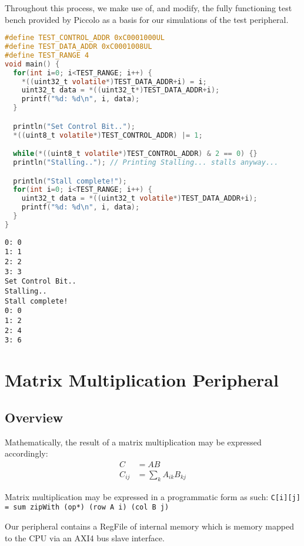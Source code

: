 \documentclass[a4paper,9pt]{report}
\begin{document}
Throughout this process, we make use of, and modify, the fully functioning test
bench provided by Piccolo as a basis for our simulations of the test peripheral.

\begin{lstlisting}[language=C,style=customc]
#define TEST_CONTROL_ADDR 0xC0001000UL
#define TEST_DATA_ADDR 0xC0001008UL
#define TEST_RANGE 4
void main() {
  for(int i=0; i<TEST_RANGE; i++) {
    *((uint32_t volatile*)TEST_DATA_ADDR+i) = i;
    uint32_t data = *((uint32_t*)TEST_DATA_ADDR+i);
    printf("%d: %d\n", i, data);
  }

  println("Set Control Bit..");
  *((uint8_t volatile*)TEST_CONTROL_ADDR) |= 1;

  while(*((uint8_t volatile*)TEST_CONTROL_ADDR) & 2 == 0) {}
  println("Stalling.."); // Printing Stalling... stalls anyway...

  println("Stall complete!");
  for(int i=0; i<TEST_RANGE; i++) {
    uint32_t data = *((uint32_t volatile*)TEST_DATA_ADDR+i);
    printf("%d: %d\n", i, data);
  }
}
\end{lstlisting}

\begin{verbatim}
0: 0
1: 1
2: 2
3: 3
Set Control Bit..
Stalling..
Stall complete!
0: 0
1: 2
2: 4
3: 6
\end{verbatim}

\section{Matrix Multiplication Peripheral}
\subsection{Overview}
Mathematically, the result of a matrix multiplication may be expressed
accordingly:
\begin{align*}
  C &= AB \\
  C_{ij} &= \sum_k A_{ik}B_{kj}
\end{align*}

Matrix multiplication may be expressed in a programmatic form as such:
\texttt{C[i][j] = sum zipWith (op*) (row A i) (col B j)}


Our peripheral contains a RegFile of internal memory which is memory mapped to
the CPU via an AXI4 bus slave interface.
\end{document}
